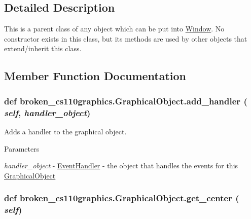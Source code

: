 \subsection{Detailed Description}
This is a parent class of any object which can be put into \hyperlink{classbroken__cs110graphics_1_1Window}{Window}. No constructor exists in this class, but its methods are used by other objects that extend/inherit this class. 

\subsection{Member Function Documentation}
\hypertarget{classbroken__cs110graphics_1_1GraphicalObject_af1f0593829e2355a58fe6e60f56e1046}{
\subsubsection[{add\_\-handler}]{\setlength{\rightskip}{0pt plus 5cm}def broken\_\-cs110graphics.GraphicalObject.add\_\-handler ( {\em self}, \/   {\em handler\_\-object})}}
\label{classbroken__cs110graphics_1_1GraphicalObject_af1f0593829e2355a58fe6e60f56e1046}


Adds a handler to the graphical object. 
\begin{DoxyParams}{Parameters}
\item[{\em handler\_\-object}]-\/ \hyperlink{classbroken__cs110graphics_1_1EventHandler}{EventHandler} -\/ the object that handles the events for this \hyperlink{classbroken__cs110graphics_1_1GraphicalObject}{GraphicalObject} \end{DoxyParams}
\hypertarget{classbroken__cs110graphics_1_1GraphicalObject_a48a1651bf6d7bf7bb2a24ed61082df66}{
\subsubsection[{get\_\-center}]{\setlength{\rightskip}{0pt plus 5cm}def broken\_\-cs110graphics.GraphicalObject.get\_\-center ( {\em self})}}
\label{classbroken__cs110graphics_1_1GraphicalObject_a48a1651bf6d7bf7bb2a24ed61082df66}


